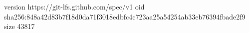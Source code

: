 version https://git-lfs.github.com/spec/v1
oid sha256:848a42d83b7f18d0da71f3018edbfc4c723aa25a54254ab33eb76394fbade2f9
size 43817
